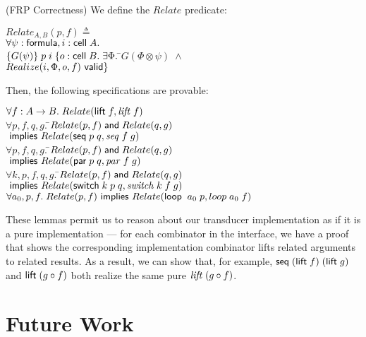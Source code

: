 \documentclass[preprint,natbib]{sigplanconf}
\begin{document}
\begin{prop}{(FRP Correctness)}
We define the $Relate$ predicate:
{\small
\begin{tabbing}
$Relate_{A,B}(p, f) \triangleq$ \\
\;\; $\forall \psi:\mbox{\textsf{{formula}}}, i:\mbox{\textsf{{cell}}}\;{A}.$ \\ 
\qquad $\{{G(\psi)}\}\;p\;i\;\{o:\mbox{\textsf{{cell}}}\;{B}.\;
               \exists \Phi.\;$\=$G(\Phi \otimes \psi) \;\land$ \\
                               \>$ Realize(i, \Phi, o, f) \mbox{\textsf{{ valid}}}\}$
\end{tabbing}
\noindent Then, the following specifications are provable: 
\begin{tabbing}
$\forall f:A\to B.\; Relate(\mbox{\textsf{{lift}}}\; f, \mathit{lift}\;f)$ \\[0.5em]

$\forall p, f, q, g.\;$\=$Relate(p, f) \;\mbox{\textsf{{and}}}\; Relate(q, g)$ \\
                       \>$\mbox{\textsf{{ implies }}} Relate(\mbox{\textsf{{seq}}}\; p\;q, \mathit{seq}\;f\;g)$ \\[0.5em]

$\forall p, f, q, g.\;$\=$Relate(p, f) \;\mbox{\textsf{{and}}}\; Relate(q, g)$ \\
                       \>$\mbox{\textsf{{ implies }}} Relate(\mbox{\textsf{{par}}}\; p\;q, \mathit{par}\;f\;g)$ \\[0.5em]

$\forall k, p, f, q, g.\;$\=$Relate(p, f) \;\mbox{\textsf{{and}}}\; Relate(q, g)$ \\
                          \>$\mbox{\textsf{{ implies }}} Relate(\mbox{\textsf{{switch}}}\; k\;p\;q, \mathit{switch}\;k\;f\;g)$ \\[0.5em]

$\forall a_0, p, f.\; 
  Relate(p, f) \mbox{\textsf{{ implies }}} Relate(\mbox{\textsf{{loop}}}\;\;a_0\;p, loop\;a_0\;f)$
\end{tabbing}
}
\end{prop}

These lemmas permit us to reason about our transducer implementation
as if it is a pure implementation --- for each combinator in the
interface, we have a proof that shows the corresponding implementation
combinator lifts related arguments to related results. As a result, 
we can show that, for example,  $\mbox{\textsf{{seq}}}\; (\mbox{\textsf{{lift}}}\; f) \;(\mbox{\textsf{{lift}}}\; g)$
and $\mbox{\textsf{{lift}}}\; (g \circ f)$ both realize the same pure $\mathit{lift}\;(g\circ f)$. 

\section{Future Work}
\end{document}
